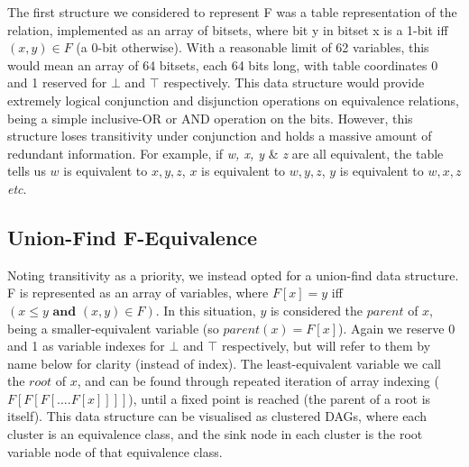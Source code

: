 \documentclass[11pt,table]{article}
\newcounter{r}
\begin{document}
The first structure we considered to represent F was a table representation of the relation, implemented as an array of bitsets, where bit y in bitset x is a 1-bit iff $ (x,y)\in F $ (a 0-bit otherwise). With a reasonable limit of 62 variables, this would mean an array of 64 bitsets, each 64 bits long, with table coordinates 0 and 1 reserved for $ \bot $ and $ \top $ respectively. This data structure would provide extremely logical conjunction and disjunction operations on equivalence relations, being a simple inclusive-OR or AND operation on the bits. However, this structure loses transitivity under conjunction and holds a massive amount of redundant information. For example, if \textit{w, x, y} \& \textit{z}  are all equivalent, the table tells us $ w $ is equivalent to $ x, y, z $, $ x $ is equivalent to $ w,y,z $, $ y $ is equivalent to $ w,x,z $ \textit{etc}. 

\subsection{Union-Find F-Equivalence}

Noting transitivity as a priority, we instead opted for a union-find data structure. F is represented as an array of variables, where $ F[x]=y $ iff $ \left(x\leq y \textbf{ and } (x,y)\in F \right)$. In this situation, $ y $ is considered the $ parent $ of $ x $, being a smaller-equivalent variable (so $ parent(x)=F[x]$). Again we reserve 0 and 1 as variable indexes for $ \bot $ and $ \top $ respectively, but will refer to them by name below for clarity (instead of index). The least-equivalent variable we call the $ root $ of $ x $, and can be found through repeated iteration of array indexing ($ F[F[F[....F[x]]]] $), until a fixed point is reached (the parent of a root is itself). This data structure can be visualised as clustered DAGs, where each cluster is an equivalence class, and the sink node in each cluster is the root variable node of that equivalence class.
\end{document}
